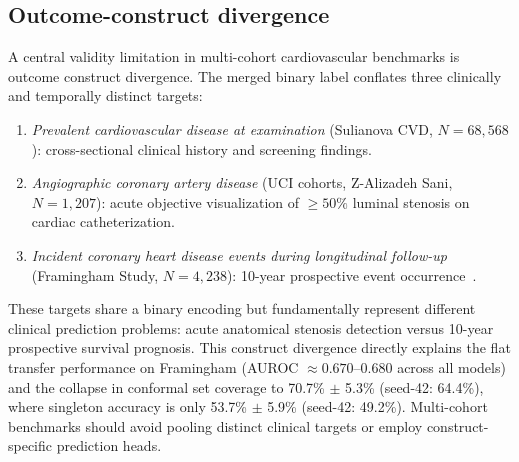\documentclass[journal]{IEEEtran}
\begin{document}
\subsection{Outcome-construct divergence}
A central validity limitation in multi-cohort cardiovascular benchmarks is outcome construct divergence. The merged binary label conflates three clinically and temporally distinct targets:
\begin{enumerate}
\item \emph{Prevalent cardiovascular disease at examination} (Sulianova CVD, $N{=}68{,}568$): cross-sectional clinical history and screening findings.
\item \emph{Angiographic coronary artery disease} (UCI cohorts, Z-Alizadeh Sani, $N{=}1{,}207$): acute objective visualization of $\ge 50\%$ luminal stenosis on cardiac catheterization.
\item \emph{Incident coronary heart disease events during longitudinal follow-up} (Framingham Study, $N{=}4{,}238$): 10-year prospective event occurrence~\cite{dawber1951}.
\end{enumerate}
These targets share a binary encoding but fundamentally represent different clinical prediction problems: acute anatomical stenosis detection versus 10-year prospective survival prognosis. This construct divergence directly explains the flat transfer performance on Framingham (AUROC $\approx 0.670$--$0.680$ across all models) and the collapse in conformal set coverage to 70.7\% $\pm$ 5.3\% (seed-42: 64.4\%), where singleton accuracy is only 53.7\% $\pm$ 5.9\% (seed-42: 49.2\%). Multi-cohort benchmarks should avoid pooling distinct clinical targets or employ construct-specific prediction heads.
\end{document}
